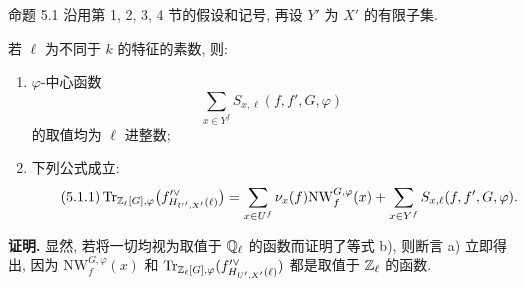 \begin{statement}{命题 5.1}
沿用第 1, 2, 3, 4 节的假设和记号, 再设 $Y'$ 为 $X'$ 的有限子集.

若 $\ell$ 为不同于 $k$ 的特征的素数, 则:
\begin{enumerate}[label=\alph*)]
\item $\varphi$-中心函数
\[
\sum_{x\in Y^f}S_{x,\ell}(f,f',G,\varphi)
\]
的取值均为 $\ell$ 进整数;
\item 下列公式成立:
\begin{equation}\tag{5.1.1}
\operatorname{Tr}_{\mathbb Z_\ell[G],\varphi}\bigl(f'^\vee_{H_{U',X'}(\ell)}\bigr)
=\sum_{x\in U^f}\nu_x(f)\mathrm{NW}^{G,\varphi}_f(x)
+\sum_{x\in Y^f}S_{x,\ell}(f,f',G,\varphi).
\end{equation}
\end{enumerate}
\end{statement}

\noindent
\textbf{证明.} 显然, 若将一切均视为取值于 $\mathbb Q_\ell$ 的函数而证明了等式 b), 则断言 a) 立即得出, 因为 $\mathrm{NW}^{G,\varphi}_{f}(x)$ 和 $\operatorname{Tr}_{\mathbb Z_\ell[G],\varphi}(f'^\vee_{H_{U',X'}(\ell)})$ 都是取值于 $\mathbb Z_\ell$ 的函数.

